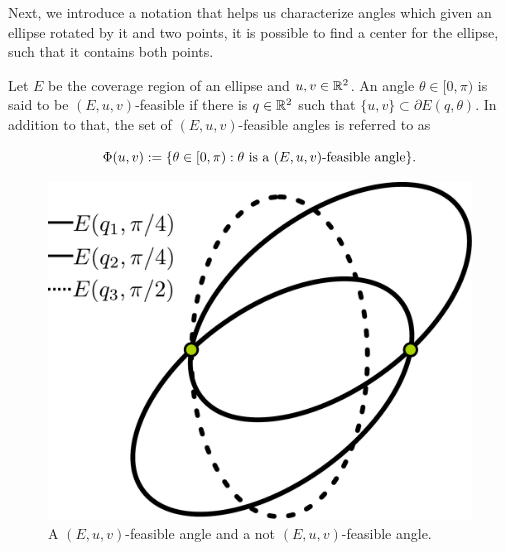 
Next, we introduce a notation that helps us characterize angles which given an ellipse rotated by it and two points, it is possible to find a center for the ellipse, such that it contains both points.

\begin{definition}\label{def:feasible_angle}
	Let $E$ be the coverage region of an ellipse and $u, v \in \mathbb{R}^2$. An angle $\theta \in [0, \pi)$ is said to be $(E, u, v)$-feasible if there is $q \in \mathbb{R}^2$ such that $\{u, v\} \subset \partial E(q, \theta)$.
	In addition to that, the set of $(E, u, v)$-feasible angles is referred to as 
	
	\begin{equation*}
	\Phi(u, v) := \{\theta \in [0, \pi) : \theta \textnormal{ is a } (E,u,v)\textnormal{-feasible angle}\}.
	\end{equation*}
\end{definition}

\begin{figure}[H]
	\centering
	\includegraphics[scale=.22]{figures/feasible-angle2}
	\caption{A $(E, u, v)$-feasible angle and a not $(E, u, v)$-feasible angle.}
	\label{fig:feasible-angle}
\end{figure}

